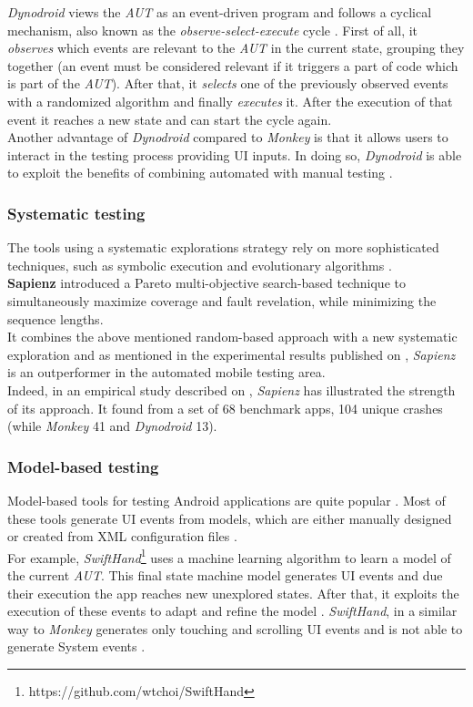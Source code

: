 \textit{Dynodroid }views the \textit{AUT} as an event-driven program and follows a cyclical mechanism, also known as the \textit{observe-select-execute} cycle \cite{dynodroid}. First of all, it \textit{observes} which events are relevant to the \textit{AUT} in the current state, grouping they together (an event must be considered relevant if it triggers a part of code which is part of the \textit{AUT}). After that, it \textit{selects} one of the previously observed events with a randomized algorithm \cite{dynodroid, areWeThereYet} and finally \textit{executes} it. After the execution of that event it reaches a new state and can start the cycle again. \\
Another advantage of \textit{Dynodroid} compared to \textit{Monkey} is that it allows users to interact in the testing process providing UI inputs. In doing so, \textit{Dynodroid} is able to exploit the benefits of combining automated with manual testing \cite{dynodroid}.

\subsubsection{Systematic testing}
The tools using a systematic explorations strategy rely on more sophisticated techniques, such as symbolic execution and evolutionary algorithms \cite{areWeThereYet}. \\
\textbf{Sapienz} \cite{sapienz} introduced a Pareto multi-objective search-based technique to simultaneously maximize coverage and fault revelation, while minimizing the sequence lengths. \\ It combines the above mentioned random-based approach with a new systematic exploration and as mentioned in the experimental results published on \cite{sapienz}, \textit{Sapienz} is an outperformer in the automated mobile testing area. \\
Indeed, in an empirical study described on \cite{sapienz}, \textit{Sapienz} has illustrated the strength of its approach. It found from a set of 68 benchmark apps, 104 unique crashes (while \textit{Monkey} 41 and \textit{Dynodroid} 13).

\subsubsection{Model-based testing}
Model-based tools for testing Android applications are quite popular \cite{sapienz}. Most of these tools \cite{mobiguitar,guiripper, swifthand, SwiftHand, mining} generate UI events from models, which are either manually designed or created from XML configuration files \cite{sapienz}. \\
For example, \textit{SwiftHand}\footnote{https://github.com/wtchoi/SwiftHand} uses a machine learning algorithm to learn a model of the current \textit{AUT}. This final state machine model \cite{areWeThereYet} generates UI events and due their execution the app reaches new unexplored states. After that, it exploits the execution of these events to adapt and refine the model \cite{swifthand}. \textit{SwiftHand}, in a similar way to \textit{Monkey} generates only touching and scrolling UI events and is not able to generate System events \cite{areWeThereYet}.

